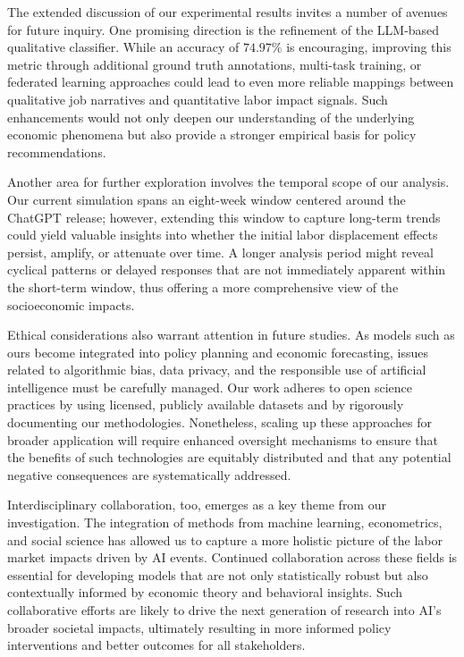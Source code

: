 \documentclass{article}
\begin{document}
The extended discussion of our experimental results invites a number of avenues for future inquiry. One promising direction is the refinement of the LLM-based qualitative classifier. While an accuracy of \(74.97\%\) is encouraging, improving this metric through additional ground truth annotations, multi-task training, or federated learning approaches could lead to even more reliable mappings between qualitative job narratives and quantitative labor impact signals. Such enhancements would not only deepen our understanding of the underlying economic phenomena but also provide a stronger empirical basis for policy recommendations.

Another area for further exploration involves the temporal scope of our analysis. Our current simulation spans an eight-week window centered around the ChatGPT release; however, extending this window to capture long-term trends could yield valuable insights into whether the initial labor displacement effects persist, amplify, or attenuate over time. A longer analysis period might reveal cyclical patterns or delayed responses that are not immediately apparent within the short-term window, thus offering a more comprehensive view of the socioeconomic impacts.

Ethical considerations also warrant attention in future studies. As models such as ours become integrated into policy planning and economic forecasting, issues related to algorithmic bias, data privacy, and the responsible use of artificial intelligence must be carefully managed. Our work adheres to open science practices by using licensed, publicly available datasets and by rigorously documenting our methodologies. Nonetheless, scaling up these approaches for broader application will require enhanced oversight mechanisms to ensure that the benefits of such technologies are equitably distributed and that any potential negative consequences are systematically addressed.

Interdisciplinary collaboration, too, emerges as a key theme from our investigation. The integration of methods from machine learning, econometrics, and social science has allowed us to capture a more holistic picture of the labor market impacts driven by AI events. Continued collaboration across these fields is essential for developing models that are not only statistically robust but also contextually informed by economic theory and behavioral insights. Such collaborative efforts are likely to drive the next generation of research into AI’s broader societal impacts, ultimately resulting in more informed policy interventions and better outcomes for all stakeholders.
\end{document}
